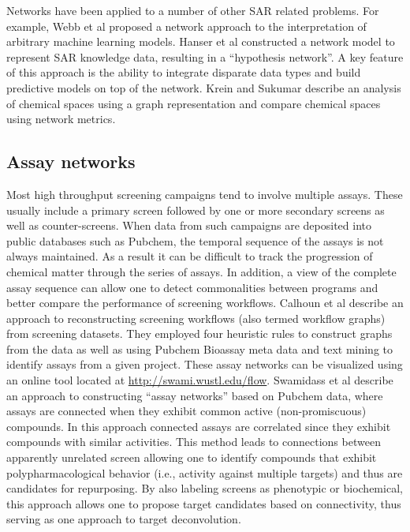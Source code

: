 \documentclass[12pt,letterpaper]{article}
\begin{document}
Networks have been applied to a number of other SAR related
problems. For example, Webb et al \cite{Webb:2014tp} proposed a
network approach to the interpretation of arbitrary machine learning
models. Hanser et al \cite{Hanser:2014gl} constructed a network model
to represent SAR knowledge data, resulting in a ``hypothesis
network''. A key feature of this approach is the ability to integrate
disparate data types and build predictive models on top of the
network. Krein and Sukumar \cite{Krein:2011tt} describe an analysis of
chemical spaces using a graph representation and compare chemical
spaces using network metrics.

\subsection{Assay networks}
\label{sec:assay-networks}

Most high throughput screening campaigns tend to involve multiple
assays. These usually include a primary screen followed by one or more
secondary screens as well as counter-screens. When data from such
campaigns are deposited into public databases such as Pubchem, the
temporal sequence of the assays is not always maintained. As a result
it can be difficult to track the progression of chemical matter
through the series of assays. In addition, a view of the complete
assay sequence can allow one to detect commonalities between programs
and better compare the performance of screening workflows. Calhoun et
al \cite{Calhoun:2012uq} describe an approach to reconstructing
screening workflows (also termed workflow graphs) from screening
datasets. They employed four heuristic rules to construct graphs from
the data as well as using Pubchem Bioassay meta data and text mining
to identify assays from a given project. These assay networks can be
visualized using an online tool located at
\href{http://swami.wustl.edu/flow}{http://swami.wustl.edu/flow}.
Swamidass et al \cite{Swamidass:2014vn} describe an approach to
constructing ``assay networks'' based on Pubchem data, where assays
are connected when they exhibit common active (non-promiscuous)
compounds. In this approach connected assays are correlated since they
exhibit compounds with similar activities. This method leads to
connections between apparently unrelated screen allowing one to
identify compounds that exhibit polypharmacological behavior (i.e.,
activity against multiple targets) and thus are candidates for
repurposing. By also labeling screens as phenotypic or biochemical,
this approach allows one to propose target candidates based on
connectivity, thus serving as one approach to target deconvolution.
\end{document}
